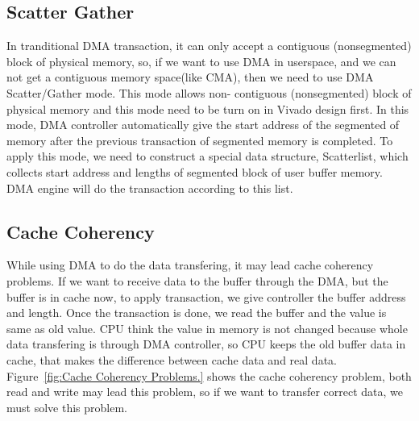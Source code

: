 \subsection{Scatter Gather}
\label{subsec:Scatter Gather}
In tranditional DMA transaction, it can only accept a contiguous (nonsegmented) block of
physical memory, so, if we want to use DMA in userspace, and we can not get a contiguous 
memory space(like CMA), then we need to use DMA Scatter/Gather mode. This mode allows non-
contiguous (nonsegmented) block of physical memory and this mode need to be turn on in Vivado 
design first. In this mode, DMA controller automatically give the start address of the 
segmented of memory after the previous transaction of segmented memory is completed. To 
apply this mode, we need to construct a special data structure, Scatterlist, which collects 
start address and lengths of segmented block of user buffer memory. DMA engine will do the
transaction according to this list. 


\subsection{Cache Coherency}
\label{subsec:Cache Coherency}
While using DMA to do the data transfering, it may lead cache coherency problems. If we want to receive data to the buffer through the DMA, but the buffer is in cache now, to apply transaction, we give controller the buffer address and length. Once the transaction is done, we read the buffer and the value is same as old value. CPU think the value in memory is not changed because whole data transfering is through DMA controller, so CPU keeps the old buffer data in cache, that makes the difference between cache data and real data. Figure~\ref{fig:Cache Coherency Problems.} shows the cache coherency problem, both read and write may lead this problem, so if we want to transfer correct data, we must solve this problem.

